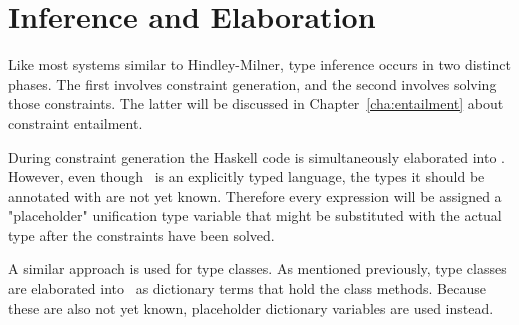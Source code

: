 \chapter{Inference and Elaboration}
\label{cha:inference}
Like most systems similar to Hindley-Milner\cite{hindley}\cite{damas-milner},
type inference occurs in two
distinct phases. The first involves constraint generation, and the second
involves solving those constraints. The latter will be discussed in
Chapter~\ref{cha:entailment} about constraint entailment.

During constraint generation the Haskell code is simultaneously elaborated into
\systemfc. However, even though \systemfc~is an explicitly typed language,
the types it should be annotated with are not yet known. Therefore every
expression will be assigned a "placeholder" unification type variable that might
be substituted with the actual type after the constraints have been solved.

A similar approach is used for type classes. As mentioned previously, type
classes are elaborated into \systemfc~as dictionary terms that hold the class
methods. Because these are also not yet known, placeholder dictionary variables
are used instead.


